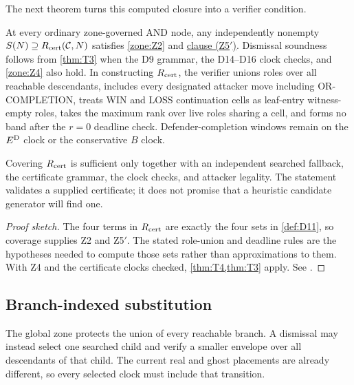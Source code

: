 The next theorem turns this computed closure into a verifier condition.

\begin{theorem}
\label{thm:T7}
\upshape
At every ordinary zone-governed AND node, any independently nonempty
$S(N)\supseteq R_{\mathrm{cert}}(\mathcal C,N)$ satisfies \cref{zone:Z2} and
\hyperref[zone:Z5prime]{clause \textup{(Z5$'$)}}.  Dismissal soundness follows
from \cref{thm:T3} when the D9 grammar, the D14--D16 clock checks, and
\cref{zone:Z4} also hold.  In constructing $R_{\mathrm{cert}}$, the verifier unions roles
over all reachable descendants, includes every designated attacker move
including OR-COMPLETION, treats WIN and LOSS continuation cells as leaf-entry
witness-empty roles, takes the maximum rank over live roles sharing a cell,
and forms no band after the $r=0$ deadline check.  Defender-completion windows
remain on the $E^{\mathrm{D}}$ clock or the conservative $B$ clock.
\end{theorem}

\begin{plainterms}
Covering $R_{\mathrm{cert}}$ is sufficient only together with an independent searched
fallback, the certificate grammar, the clock checks, and attacker legality.
The statement validates a supplied certificate; it does not promise that a
heuristic candidate generator will find one.
\end{plainterms}

\begin{proof}[Proof sketch]
The four terms in $R_{\mathrm{cert}}$ are exactly the four sets in \cref{def:D11}, so
coverage supplies Z2 and Z5$'$.  The stated role-union and deadline rules are
the hypotheses needed to compute those sets rather than approximations to
them.  With Z4 and the certificate clocks checked, \cref{thm:T4,thm:T3}
apply.  See \cite{hexobot-companions}.
\end{proof}

\subsection{Branch-indexed substitution}

The global zone protects the union of every reachable branch.  A dismissal
may instead select one searched child and verify a smaller envelope over all
descendants of that child.  The current real and ghost placements are already
different, so every selected clock must include that transition.

